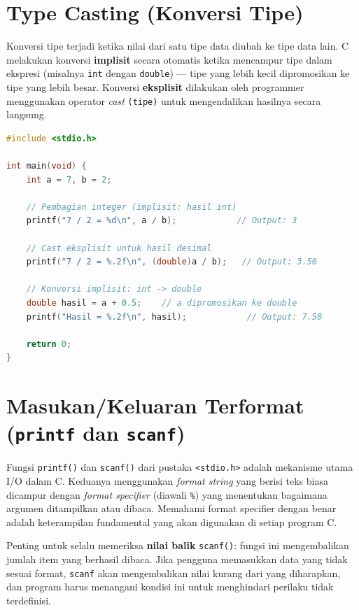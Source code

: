 \documentclass[../main.tex]{subfiles}
\begin{document}
\section{Type Casting (Konversi Tipe)}

Konversi tipe terjadi ketika nilai dari satu tipe data diubah ke tipe data lain. C melakukan konversi \textbf{implisit} secara otomatis ketika mencampur tipe dalam ekspresi (misalnya \texttt{int} dengan \texttt{double}) --- tipe yang lebih kecil dipromosikan ke tipe yang lebih besar. Konversi \textbf{eksplisit} dilakukan oleh programmer menggunakan operator \textit{cast} \texttt{(tipe)} untuk mengendalikan hasilnya secara langsung.

\begin{lstlisting}[language=C,caption=Type casting implisit dan eksplisit]
#include <stdio.h>

int main(void) {
    int a = 7, b = 2;
    
    // Pembagian integer (implisit: hasil int)
    printf("7 / 2 = %d\n", a / b);            // Output: 3
    
    // Cast eksplisit untuk hasil desimal
    printf("7 / 2 = %.2f\n", (double)a / b);   // Output: 3.50
    
    // Konversi implisit: int -> double
    double hasil = a + 0.5;    // a dipromosikan ke double
    printf("Hasil = %.2f\n", hasil);            // Output: 7.50
    
    return 0;
}
\end{lstlisting}

\section{Masukan/Keluaran Terformat (\texttt{printf} dan \texttt{scanf})}

Fungsi \texttt{printf()} dan \texttt{scanf()} dari pustaka \texttt{<stdio.h>} adalah mekanisme utama I/O dalam C. Keduanya menggunakan \textit{format string} yang berisi teks biasa dicampur dengan \textit{format specifier} (diawali \texttt{\%}) yang menentukan bagaimana argumen ditampilkan atau dibaca. Memahami format specifier dengan benar adalah keterampilan fundamental yang akan digunakan di setiap program C.

Penting untuk selalu memeriksa \textbf{nilai balik} \texttt{scanf()}: fungsi ini mengembalikan jumlah item yang berhasil dibaca. Jika pengguna memasukkan data yang tidak sesuai format, \texttt{scanf} akan mengembalikan nilai kurang dari yang diharapkan, dan program harus menangani kondisi ini untuk menghindari perilaku tidak terdefinisi.
\end{document}
